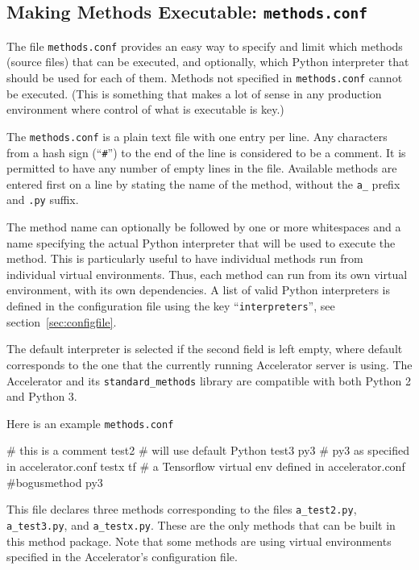 \subsection{Making Methods Executable:  \texttt{methods.conf}}
\label{sec:methods_conf}
The file \texttt{methods.conf} provides an easy way to specify and
limit which methods (source files) that can be executed, and
optionally, which Python interpreter that should be used for each of
them.  Methods not specified in \texttt{methods.conf} cannot be
executed.  (This is something that makes a lot of sense in any
production environment where control of what is executable is key.)

The \texttt{methods.conf} is a plain text file with one entry per
line.  Any characters from a hash sign (``\texttt{\#}'') to the end of
the line is considered to be a comment.  It is permitted to have any
number of empty lines in the file.  Available methods are entered
first on a line by stating the name of the method, without the
\texttt{a\_} prefix and \texttt{.py} suffix.

The method name can optionally be followed by one or more whitespaces
and a name specifying the actual Python interpreter that will be used
to execute the method.  This is particularly useful to have individual
methods run from individual virtual environments.  Thus, each method
can run from its own virtual environment, with its own dependencies.
A list of valid Python interpreters is defined in the configuration
file using the key ``\texttt{interpreters}'', see
section~\ref{sec:configfile}.

The default interpreter is selected if the second field is left empty,
where default corresponds to the one that the currently running
Accelerator server is using.  The Accelerator and
its \texttt{standard\_methods} library are compatible with both Python
2 and Python 3.

Here is an example \texttt{methods.conf}
\begin{shell}
# this is a comment
test2                # will use default Python
test3           py3  # py3 as specified in accelerator.conf
testx           tf   # a Tensorflow virtual env defined in accelerator.conf
#bogusmethod    py3
\end{shell}
This file declares three methods corresponding to the files
\texttt{a\_test2.py}, \texttt{a\_test3.py}, and \texttt{a\_testx.py}.
These are the only methods that can be built in this method package.
Note that some methods are using virtual environments specified in the
Accelerator's configuration file.



